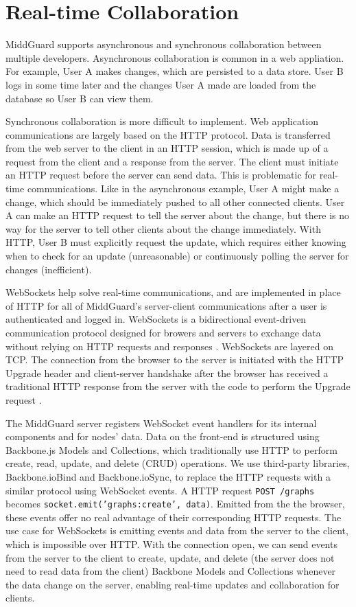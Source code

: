 \documentclass[midd]{thesis}
\begin{document}
\section{Real-time Collaboration}

MiddGuard supports asynchronous and synchronous collaboration between multiple
developers. Asynchronous collaboration is common in a web appliation. For
example, User A makes changes, which are persisted to a data store. User B logs
in some time later and the changes User A made are loaded from the database so
User B can view them.

Synchronous collaboration is more difficult to implement. Web application
communications are largely based on the HTTP protocol. Data is transferred from
the web server to the client in an HTTP session, which is made up of a request
from the client and a response from the server. The client must initiate an HTTP
request before the server can send data. This is problematic for real-time
communications. Like in the asynchronous example, User A might make a change,
which should be immediately pushed to all other connected clients. User A can
make an HTTP request to tell the server about the change, but there is no way
for the server to tell other clients about the change immediately. With HTTP,
User B must explicitly request the update, which requires either knowing when to
check for an update (unreasonable) or continuously polling the server for
changes (inefficient).

WebSockets help solve real-time communications, and are implemented in place of
HTTP for all of MiddGuard's server-client communications after a user is
authenticated and logged in. WebSockets is a bidirectional event-driven
communication protocol designed for browers and servers to exchange data without
relying on HTTP requests and responses \cite{mdn-websockets}. WebSockets are
layered on TCP. The connection from the browser to the server is initiated with
the HTTP Upgrade header and client-server handshake after the browser has
received a traditional HTTP response from the server with the code to perform
the Upgrade request \cite{RFC6455}.

The MiddGuard server registers WebSocket event handlers for its internal
components and for nodes' data. Data on the front-end is structured using
Backbone.js Models and Collections, which traditionally use HTTP to perform
create, read, update, and delete (CRUD) operations. We use third-party
libraries, Backbone.ioBind and Backbone.ioSync, to replace the HTTP requests
with a similar protocol using WebSocket events. A HTTP request \texttt{POST
/graphs} becomes \texttt{socket.emit('graphs:create', data)}. Emitted from the
the browser, these events offer no real advantage of their corresponding HTTP
requests. The use case for WebSockets is emitting events and data from the
server to the client, which is impossible over HTTP. With the connection open,
we can send events from the server to the client to create, update, and delete
(the server does not need to read data from the client) Backbone Models and
Collections whenever the data change on the server, enabling real-time updates
and collaboration for clients.
\end{document}
